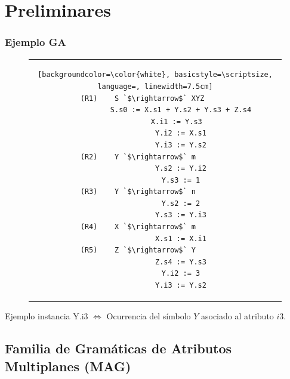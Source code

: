 \documentclass[10pt]{beamer}
\begin{document}
\section{Preliminares}


\begin{frame}[fragile]
    \frametitle{Ejemplo GA}

\begin{figure}[h]
\begin{center}
\begin{tabular}{c}
\begin{lstlisting}[backgroundcolor=\color{white}, basicstyle=\scriptsize, language=, linewidth=7.5cm]
(R1)    S `$\rightarrow$` XYZ      
            S.s0 := X.s1 + Y.s2 + Y.s3 + Z.s4
            X.i1 := Y.s3  
            Y.i2 := X.s1
            Y.i3 := Y.s2
(R2)    Y `$\rightarrow$` m        
            Y.s2 := Y.i2
            Y.s3 := 1
(R3)    Y `$\rightarrow$` n        
            Y.s2 := 2
            Y.s3 := Y.i3
(R4)    X `$\rightarrow$` m        
            X.s1 := X.i1
(R5)    Z `$\rightarrow$` Y        
            Z.s4 := Y.s3
            Y.i2 := 3
            Y.i3 := Y.s2
\end{lstlisting} 
\end{tabular}
\end{center}
\end{figure}

    \pause

    \begin{block}{Ejemplo instancia}
        Y.i3 $\Leftrightarrow$ Ocurrencia del símbolo $Y$ asociado al atributo $i3$.
    \end{block}
\end{frame}

\subsection{Familia de Gramáticas de Atributos Multiplanes (MAG)}
\end{document}
